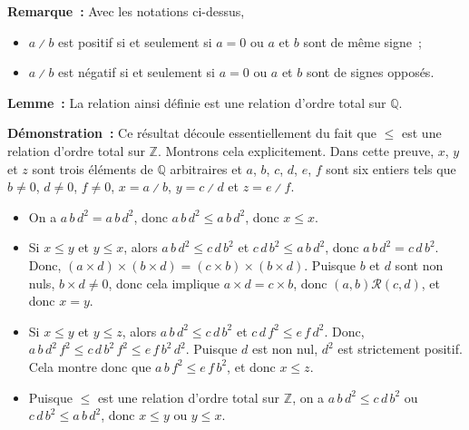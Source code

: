     \done

\medskip

\noindent\textbf{Remarque :} Avec les notations ci-dessus, 
\begin{itemize}[nosep]
    \item $a \divslash b$ est positif si et seulement si $a = 0$ ou $a$ et $b$ sont de même signe ;
    \item $a \divslash b$ est négatif si et seulement si $a = 0$ ou $a$ et $b$ sont de signes opposés.
\end{itemize}

\medskip

\noindent\textbf{Lemme :} La relation ainsi définie est une relation d'ordre total sur $\mathbb{Q}$.

\medskip

\noindent\textbf{Démonstration :} Ce résultat découle essentiellement du fait que $\leq$ est une relation d'ordre total sur $\mathbb{Z}$.
    Montrons cela explicitement.
    Dans cette preuve, $x$, $y$ et $z$ sont trois éléments de $\mathbb{Q}$ arbitraires et $a$, $b$, $c$, $d$, $e$, $f$ sont six entiers tels que $b \neq 0$, $d \neq 0$, $f \neq 0$, $x = a \divslash b$, $y = c \divslash d$ et $z = e \divslash f$.
    \begin{itemize}[nosep]
        \item On a $a \, b \, d^2 = a \, b \, d^2$, donc $a \, b \, d^2 \leq a \, b \, d^2$, donc $x \leq x$.
        \item Si $x \leq y$ et $y \leq x$, alors $a \, b \, d^2 \leq c \, d \, b^2$ et $c \, d \, b^2 \leq a \, b \, d^2$, donc $a \, b \, d^2 = c \, d \, b^2$.
            Donc, $(a \times d) \times (b \times d) = (c \times b) \times (b \times d)$.
            Puisque $b$ et $d$ sont non nuls, $b \times d \neq 0$, donc cela implique $a \times d = c \times b$, donc $(a, b) \mathrel{\mathcal{R}} (c, d)$, et donc $x = y$.
        \item Si $x \leq y$ et $y \leq z$, alors $a \, b \, d^2 \leq c \, d \, b^2$ et $c \, d \, f^2 \leq e \, f \, d^2$.
            Donc, $a \, b \, d^2 \, f^2 \leq c \, d \, b^2 \, f^2 \leq e \, f \, b^2 \, d^2$.
            Puisque $d$ est non nul, $d^2$ est strictement positif.
            Cela montre donc que $a \, b \, f^2 \leq e \, f \, b^2$, et donc $x \leq z$.
        \item Puisque $\leq$ est une relation d'ordre total sur $\mathbb{Z}$, on a $a \, b \, d^2 \leq c \, d \, b^2$ ou $c \, d \, b^2 \leq a \, b \, d^2$, donc $x \leq y$ ou $y \leq x$.
    \end{itemize}

